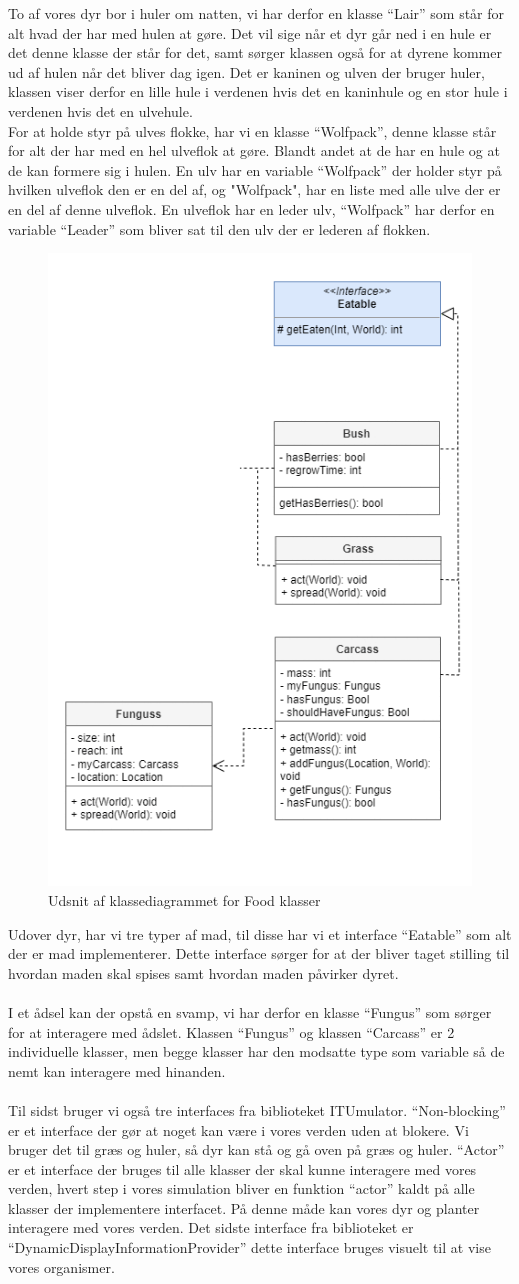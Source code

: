 \documentclass[12pt]{article}
\begin{document}
    To af vores dyr bor i huler om natten, vi har derfor en klasse “Lair” som står for alt hvad der har med hulen at gøre. Det vil sige når et dyr går ned i en hule er det denne klasse der står for det, samt sørger klassen også for at dyrene kommer ud af hulen når det bliver dag igen. Det er kaninen og ulven der bruger huler, klassen viser derfor en lille hule i verdenen hvis det en kaninhule og en stor hule i verdenen hvis det en ulvehule.
    \\For at holde styr på ulves flokke, har vi en klasse “Wolfpack”, denne klasse står for alt der har med en hel ulveflok at gøre. Blandt andet at de har en hule og at de kan formere sig i hulen. En ulv har en variable “Wolfpack” der holder styr på hvilken ulveflok den er en del af, og "Wolfpack", har en liste med alle ulve der er en del af denne ulveflok. En ulveflok har en leder ulv, “Wolfpack” har derfor en variable “Leader” som bliver sat til den ulv der er lederen af flokken.
    \begin{figure}[H]
        \centering
        \includegraphics[width=0.4\columnwidth]{../ClassFood.png}
        \caption{Udsnit af klassediagrammet for Food klasser}  
    \end{figure}  
    Udover dyr, har vi tre typer af mad, til disse har vi et interface “Eatable” som alt der er mad implementerer. Dette interface sørger for at der bliver taget stilling til hvordan maden skal spises samt hvordan maden påvirker dyret.
    \\ \\I et ådsel kan der opstå en svamp, vi har derfor en klasse “Fungus” som sørger for at interagere med ådslet. Klassen “Fungus” og klassen “Carcass” er 2 individuelle klasser, men begge klasser har den modsatte type som variable så de nemt kan interagere med hinanden.
\\ \\Til sidst bruger vi også tre interfaces fra biblioteket ITUmulator.
“Non-blocking” er et interface der gør at noget kan være i  vores verden uden at blokere. Vi bruger det til græs og huler, så dyr kan stå og gå oven på græs og huler.
“Actor” er et interface der bruges til alle klasser der skal kunne interagere med vores verden, hvert step i vores simulation bliver en funktion “actor” kaldt på alle klasser der implementere interfacet. På denne måde kan vores dyr og planter interagere med vores verden.
Det sidste interface fra biblioteket er “DynamicDisplayInformationProvider” dette interface bruges visuelt til at vise vores organismer.
\end{document}
